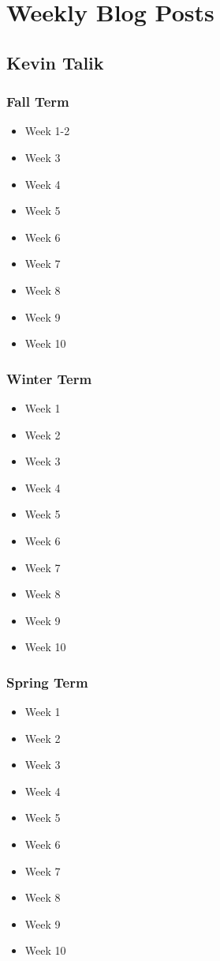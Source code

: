 
\section{Weekly Blog Posts}
	\subsection{Kevin Talik}
	\subsubsection{Fall Term}
	\begin{itemize}
		\item{Week 1-2}
		\item{Week 3}
		\item{Week 4}
		\item{Week 5}
		\item{Week 6}
		\item{Week 7}
		\item{Week 8}
		\item{Week 9}
		\item{Week 10}
	\end{itemize}
	\subsubsection{Winter Term}
	\begin{itemize}
		\item{Week 1}
		\item{Week 2}
		\item{Week 3}
		\item{Week 4}
		\item{Week 5}
		\item{Week 6}
		\item{Week 7}
		\item{Week 8}
		\item{Week 9}
		\item{Week 10}
	\end{itemize}

	\subsubsection{Spring Term}
	\begin{itemize}
		\item{Week 1}
		\item{Week 2}
		\item{Week 3}
		\item{Week 4}
		\item{Week 5}
		\item{Week 6}
		\item{Week 7}
		\item{Week 8}
		\item{Week 9}
		\item{Week 10}
	\end{itemize}

